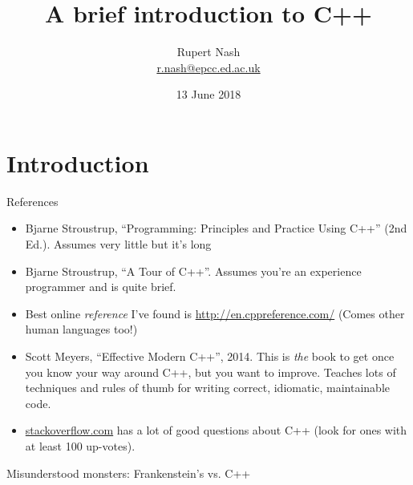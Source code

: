 \documentclass[presentation,t]{beamer}
\author{Rupert Nash\\ \url{r.nash@epcc.ed.ac.uk}}
\date{13 June 2018}
\title{A brief introduction to C++}
\begin{document}
\frame{\titlepage}
\section{Introduction}

\begin{frame}{References}
  \begin{itemize}
  \item Bjarne Stroustrup, ``Programming: Principles and Practice
    Using C++'' (2nd Ed.). Assumes very little but it's long
  \item Bjarne Stroustrup, ``A Tour of C++''. Assumes you're an
    experience programmer and is quite brief.
  \item Best online \emph{reference} I've found is
    \url{http://en.cppreference.com/} (Comes other human languages
    too!)
  \item Scott Meyers, ``Effective Modern C++'', 2014. This is
    \emph{the} book to get once you know your way around C++, but you
    want to improve. Teaches lots of techniques and rules of thumb for
    writing correct, idiomatic, maintainable code.
  \item \url{stackoverflow.com} has a lot of good questions about C++
    (look for ones with at least 100 up-votes).
  \end{itemize}
\end{frame}

  \begin{frame}{Misunderstood monsters: Frankenstein's vs. C++}
\end{frame}
\end{document}
